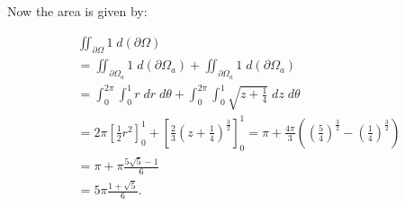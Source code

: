 \documentclass[11pt]{article}
\begin{document}
\begin{solution}
Now the area is given by:

\begin{align*}
        &
	\iint_{\partial\Omega} 1 \;d (\partial \Omega)
        \\&
        =	\iint_{\partial\Omega_a} 1 \;d (\partial \Omega_a) + 	\iint_{\partial\Omega_a} 1 \;d (\partial \Omega_a)
        \\&
        = \int_0^{2\pi} \int_0^1 r \;d r\;d\theta + \int_0^{2\pi} \int_0^1\sqrt{z+\frac{1}{4}}\;d z \;d \theta
        \\&
        = 2\pi\left[\frac{1}{2}r^2\right]_0^1 + \left[\frac{2}{3}(z+\frac{1}{4})^{\frac{3}{2}}\right]_0^1 = \pi + \frac{4\pi}{3}\left(\left(\frac{5}{4}\right)^{\frac{3}{2}} - \left(\frac{1}{4}\right)^{\frac{3}{2}}\right)
        \\&
        = \pi + \pi \frac{5\sqrt{5} - 1}{6}
        \\&
        = 5\pi \frac{1 + \sqrt{5}}{6}
        .
    \end{align*}
\end{solution}
\end{document}
